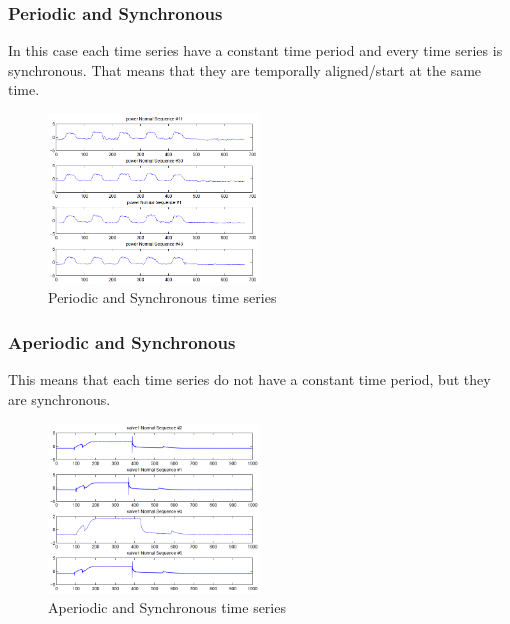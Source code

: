 \documentclass[english, a4paper]{report}
\begin{document}
{{{            \subsubsection{Periodic and Synchronous}
            {
                In this case each time series have a constant time period and every time series is synchronous. That means that they are temporally aligned/start at the same time.
                
                \begin{figure}[H]
                    \centering \includegraphics[width=0.5\textwidth]{periodicSynchronous}
                    \caption{Periodic and Synchronous time series \cite{anomalyDetectionOfTimeSeries}}
                    \label{fig:periodicSynchronous}
                \end{figure}
            }
            
            \subsubsection{Aperiodic and Synchronous}
            {
                This means that each time series do not have a constant time period, but they are synchronous.
                
                \begin{figure}[H]
                    \centering \includegraphics[width=0.5\textwidth]{aperiodicSynchronous}
                    \caption{Aperiodic and Synchronous time series \cite{anomalyDetectionOfTimeSeries}}
                    \label{fig:aperiodicSynchronous}
                \end{figure}
            }
            
}}}
\end{document}
